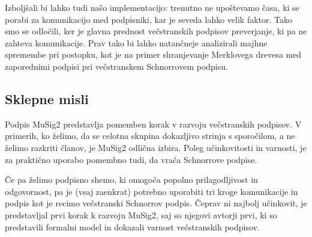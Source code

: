 \documentclass[isrm2, tisk]{fmfdelo}
\begin{document}
Izboljšali bi lahko tudi našo implementacijo: trenutno ne upoštevamo časa, ki se porabi za
komunikacijo med podpisniki, kar je seveda lahko velik faktor. Tako smo se odločili, ker je glavna
prednost večstranskih podpisov preverjanje, ki pa ne zahteva komunikacije. Prav tako bi lahko
natančneje analizirali majhne spremembe pri postopku, kot je na primer shranjevanje Merklovega drevesa
med zaporednimi podpisi pri večstranskem Schnorrovem podpisu.

\subsection{Sklepne misli}
Podpis MuSig2 predstavlja pomemben korak v razvoju večstranskih podpisov. V primerih, ko želimo, da
se celotna skupina dokazljivo strinja s sporočilom, a ne želimo razkriti članov, je MuSig2 odlična
izbira. Poleg učinkovitosti in varnosti, je za praktično uporabo pomembno tudi, da vrača Schnorrove
podpise.

Če pa želimo podpisno shemo, ki omogoča popolno prilagodljivost in odgovornost, pa je (vsaj zaenkrat)
potrebno uporabiti tri kroge komunikacije in podpis kot je recimo večstranski Schnorrov podpis. Čeprav
ni najbolj učinkovit, je predstavljal prvi korak k razvoju MuSig2, saj so njegovi avtorji prvi, ki so
predstavili formalni model in dokazali varnost večstranskih podpisov.

%
\end{document}
